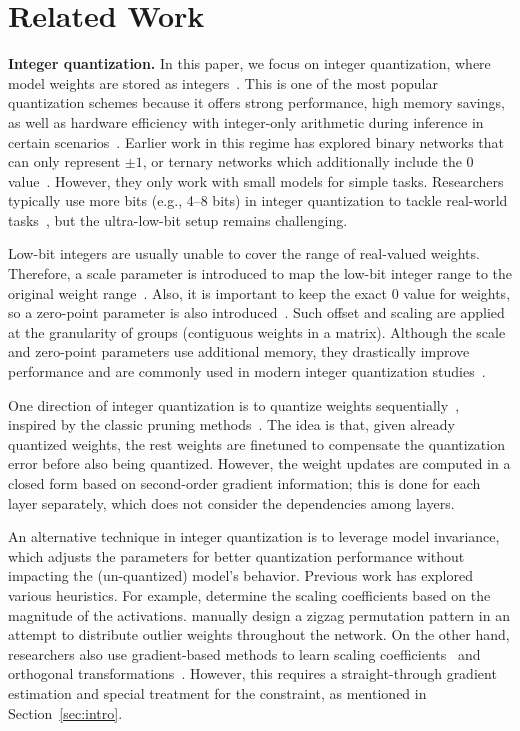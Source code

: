 \section{Related Work}
\textbf{Integer quantization.} In this paper, we focus on integer quantization, where model weights are stored as integers~\citep{Jacob_2018_CVPR,wu2020integer}.
This is one of the most popular quantization schemes because it offers strong performance, high memory savings, as well as hardware efficiency with integer-only arithmetic during inference in certain scenarios~\citep{Jacob_2018_CVPR,awq}.
Earlier work in this regime has explored binary networks that can only represent $\pm 1$, or ternary networks which additionally include the $0$ value~\citep{NIPS2015_3e15cc11,lin2015neural}. However, they only work with small models for simple tasks.
Researchers typically use more bits (e.g., 4--8 bits) in integer quantization to tackle real-world tasks~\cite{krishnamoorthi2018quantizing,NEURIPS2022_c3ba4962,gptq}, but the ultra-low-bit setup remains challenging. 

Low-bit integers are usually unable to cover the range of real-valued weights. Therefore, a scale parameter is introduced to map the low-bit integer range to the original weight range~\cite{zhou2016dorefa,Jacob_2018_CVPR}. Also, it is important to keep the exact 0 value for weights, so a zero-point parameter is also introduced~\cite{Jacob_2018_CVPR}. Such offset and scaling are applied at the granularity of groups (contiguous weights in a matrix). Although the scale and zero-point parameters use additional memory, they drastically improve performance and are commonly used in modern integer quantization studies~\citep{gptq,awq,omniquant}.


One direction of integer quantization is to quantize weights sequentially~\cite{obq,gptq}, inspired by the classic pruning methods~\citep{obs}. The idea is that, given already quantized weights, the rest weights are finetuned to compensate the quantization error before also being quantized. However, the weight updates are computed in a closed form based on second-order gradient information; this is done for each layer separately, which does not consider the dependencies among layers.

An alternative technique in integer quantization is to leverage model invariance, which adjusts the parameters for better quantization performance without impacting the (un-quantized) model's behavior. Previous work has explored various heuristics. For example, \citet{awq} determine the scaling coefficients based on the magnitude of the activations. \citet{lin2024duquant} manually design a zigzag permutation pattern in an attempt to distribute outlier weights throughout the network.
On the other hand, researchers also use gradient-based methods to learn scaling coefficients~\citep{omniquant} and orthogonal transformations~\citep{spinquant}.
However, this requires a straight-through gradient estimation and special treatment for the constraint, as mentioned in Section~\ref{sec:intro}.

